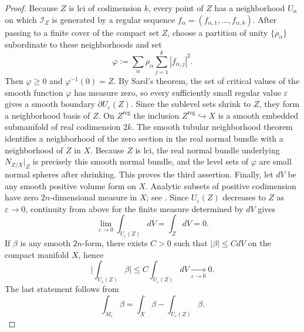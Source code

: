 \documentclass[12pt,a4paper,dvipsnames,x11names]{amsart}
\numberwithin{equation}{section}
\theoremstyle{plain}
\theoremstyle{definition}
\theoremstyle{remark}
\newcommand{\II}{\mathscr I}
\newcommand{\reg}{\mathrm{reg}}
\begin{document}
\begin{proof}
Because $Z$ is lci of codimension $k$, every point of $Z$ has a neighborhood $U_\alpha$ on which $\II_Z$ is generated by a regular sequence $f_\alpha=(f_{\alpha,1},\dots,f_{\alpha,k})$. After passing to a finite cover of the compact set $Z$, choose a partition of unity $\{\rho_\alpha\}$ subordinate to these neighborhoods and set
\begin{equation}\label{eq:phi-global}
\varphi:=\sum_{\alpha}\rho_\alpha\sum_{j=1}^k |f_{\alpha,j}|^2.
\end{equation}
Then $\varphi\ge 0$ and $\varphi^{-1}(0)=Z$.
By Sard's theorem, the set of critical values of the smooth function $\varphi$ has measure zero, so every sufficiently small regular value $\varepsilon$ gives a smooth boundary $\partial U_\varepsilon(Z)$. Since the sublevel sets shrink to $Z$, they form a neighborhood basis of $Z$.
On $Z^\reg$ the inclusion $Z^\reg\hookrightarrow X$ is a smooth embedded submanifold of real codimension $2k$. The smooth tubular neighborhood theorem identifies a neighborhood of the zero section in the real normal bundle with a neighborhood of $Z$ in $X$. Because $Z$ is lci, the real normal bundle underlying $N_{Z/X}|_{Z}$ is precisely this smooth normal bundle, and the level sets of $\varphi$ are small normal spheres after shrinking. This proves the third assertion. 
Finally, let $dV$ be any smooth positive volume form on $X$. Analytic subsets of positive codimension have zero $2n$-dimensional measure in $X$; see \cite{King71,Demailly}. Since $U_\varepsilon(Z)$ decreases to $Z$ as $\varepsilon\to 0$, continuity from above for the finite measure determined by $dV$ gives
\begin{equation}\label{eq:volume-to-zero}
\lim_{\varepsilon\to 0}\int_{U_\varepsilon(Z)} dV=\int_Z dV=0.
\end{equation}
If $\beta$ is any smooth $2n$-form, there exists $C>0$ such that $|\beta|\le C dV$ on the compact manifold $X$, hence
\begin{equation}\label{eq:beta-bound-by-volume}
\Big|\int_{U_\varepsilon(Z)}\beta\Big|\le C\int_{U_\varepsilon(Z)}dV\xrightarrow[\varepsilon\to 0]{}0.
\end{equation}
The last statement follows from
\begin{equation}\label{eq:split-X}
\int_{M_\varepsilon}\beta=\int_X\beta-\int_{U_\varepsilon(Z)}\beta.
\end{equation}
\end{proof}
\end{document}
